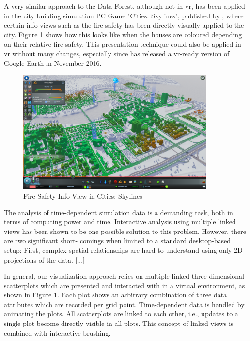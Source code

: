A very similar approach to the Data Forest, although not in \gls{vr}, has been applied in the city building simulation PC Game "Cities: Skylines", published by \cite{Paradox2014}, where certain info views such as the fire safety has been directly visually applied to the city. Figure \ref{fig:citiesskylinesfiresafety} shows how this looks like when the houses are coloured depending on their relative fire safety. This presentation technique could also be applied in \gls{vr} without many changes, especially since \cite{Google2016a} has released a \gls{vr}-ready version of Google Earth in November 2016.
\begin{figure}[b]
	\begin{center}
		\includegraphics[width=10cm]{03_Figures/05_LitReview/ParadoxWiki2014_CitiesSkylines.png}
		\caption[Fire Safety Info View in Cities: Skylines]{Fire Safety Info View in Cities: Skylines \citep{Paradox2014}}
		\label{fig:citiesskylinesfiresafety}
	\end{center}
\end{figure}


The analysis of time-dependent simulation data is a demanding task, both in terms of computing power and time. Interactive analysis using multiple linked views has been shown to be one possible solution to this problem. However, there are two significant short- comings when limited to a standard desktop-based setup: First, complex spatial relationships are hard to understand using only 2D projections of the data. [...]
\cite{Hentschel2009}

In general, our visualization approach relies on multiple linked three-dimensional scatterplots which are presented and interacted with in a virtual environment, as shown in Figure 1. Each plot shows an arbitrary combination of three data attributes which are recorded per grid point. Time-dependent data is handled by animating the plots. All scatterplots are linked to each other, i.e., updates to a single plot become directly visible in all plots. This concept of linked views is combined with interactive brushing.
\cite{Hentschel2009}



